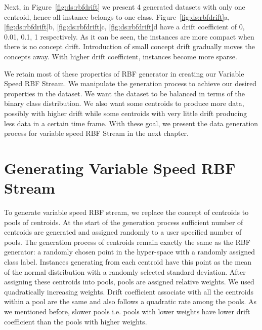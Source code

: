 Next, in Figure~\ref{fig:ds:rbfdrift} we present 4 generated datasets with only one centroid, hence all instance belongs to one class. Figure~\ref{fig:ds:rbfdrift}a, \ref{fig:ds:rbfdrift}b, \ref{fig:ds:rbfdrift}c, \ref{fig:ds:rbfdrift}d have a drift coefficient of 0, 0.01, 0.1, 1 respectively. As it can be seen, the instances are more compact when there is no concept drift. Introduction of small concept drift gradually moves the concepts away. With higher drift coefficient, instances become more sparse.

We retain most of these properties of RBF generator in creating our Variable Speed RBF Stream. We manipulate the generation process to achieve our desired properties in the dataset. We want the dataset to be balanced in terms of the binary class distribution. We also want some centroids to produce more data, possibly with higher drift while some centroids with very little drift producing less data in a certain time frame. With these goal, we present the data generation process for variable speed RBF Stream in the next chapter.

\section{Generating Variable Speed RBF Stream}
To generate variable speed RBF stream, we replace the concept of centroids to pools of centroids. At the start of the generation process sufficient number of centroids are generated and assigned randomly to a user specified number of pools. The generation process of centroids remain exactly the same as the RBF generator: a randomly chosen point in the hyper-space with a randomly assigned class label. Instances generating from each centroid have this point as the mean of the normal distribution with a randomly selected standard deviation. After assigning these centroids into pools, pools are assigned relative weights. We used quadratically increasing weights. Drift coefficient associate with all the centroids within a pool are the same and also follows a quadratic rate among the pools. As we mentioned before, slower pools i.e. pools with lower weights have lower drift coefficient than the pools with higher weights.

